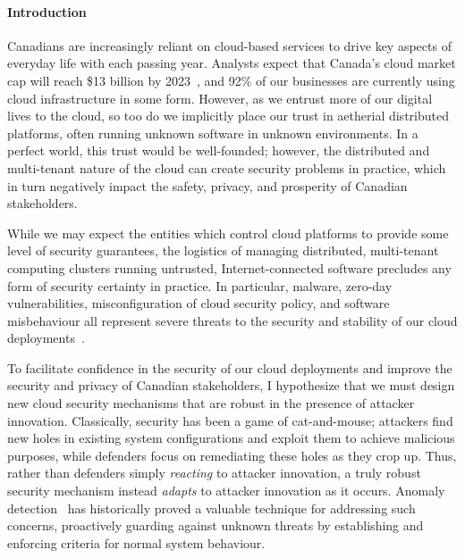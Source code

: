 \setcounter{page}{1}

\paragraph*{Introduction}

Canadians are increasingly reliant on cloud-based services to drive key aspects of everyday life with each passing year. Analysts expect that Canada's cloud market cap will reach \$13 billion by 2023~\cite{miltz2019_spending}, and 92\% of our businesses are currently using cloud infrastructure in some form. However, as we entrust more of our digital lives to the cloud, so too do we implicitly place our trust in aetherial distributed platforms, often running unknown software in unknown environments. In a perfect world, this trust would be well-founded; however, the distributed and multi-tenant nature of the cloud can create security problems in practice, which in turn negatively impact the safety, privacy, and prosperity of Canadian stakeholders.

While we may expect the entities which control cloud platforms to provide some level of security guarantees, the logistics of managing distributed, multi-tenant computing clusters running untrusted, Internet-connected software precludes any form of security certainty in practice. In particular, malware, zero-day vulnerabilities, misconfiguration of cloud security policy, and software misbehaviour all represent severe threats to the security and stability of our cloud deployments~\cite{majmudar2018_challenges}.

To facilitate confidence in the security of our cloud deployments and improve the security and privacy of Canadian stakeholders, I hypothesize that we must design new cloud security mechanisms that are robust in the presence of attacker innovation. Classically, security has been a game of cat-and-mouse; attackers find new holes in existing system configurations and exploit them to achieve malicious purposes, while defenders focus on remediating these holes as they crop up. Thus, rather than defenders simply \textit{reacting} to attacker innovation, a truly robust security mechanism instead \textit{adapts} to attacker innovation as it occurs. Anomaly detection~\cite{denning1986_intrusion, forrest1996_self} has historically proved a valuable technique for addressing such concerns, proactively guarding against unknown threats by establishing and enforcing criteria for normal system behaviour.

